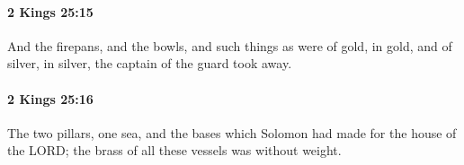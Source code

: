 		\paragraph{2 Kings 25:15} %
			\label{2KINGS-25-15}

			And the firepans, and the bowls, and such things as were of gold, in gold, and of silver, in silver, the captain of the guard took away.


		\paragraph{2 Kings 25:16} %
			\label{2KINGS-25-16}

			The two pillars, one sea, and the bases which Solomon had made for the house of the LORD; the brass of all these vessels was without weight.


